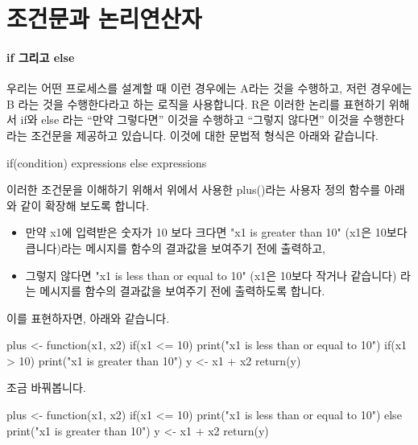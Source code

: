 \documentclass{book}
\begin{document}
\section{조건문과 논리연산자}

\paragraph{if 그리고 else} 
우리는 어떤 프로세스를 설계할 때 이런 경우에는 A라는 것을 수행하고, 저런 경우에는 B 라는 것을 수행한다라고 하는 로직을 사용합니다. 
R은 이러한 논리를 표현하기 위해서 if와 else 라는 ``만약 그렇다면'' 이것을 수행하고 ``그렇지 않다면'' 이것을 수행한다라는 조건문을 제공하고 있습니다.  
이것에 대한 문법적 형식은 아래와 같습니다. 

\begin{Schunk}
\begin{Soutput}
if(condition){
	expressions
}
else {
	expressions
}
\end{Soutput}
\end{Schunk}

이러한 조건문을 이해하기 위해서 위에서 사용한 plus()라는 사용자 정의 함수를 아래와 같이 확장해 보도록 합니다. 

\begin{itemize}
	\item 만약 x1에 입력받은 숫자가 10 보다 크다면 "x1 is greater than 10" (x1은 10보다 큽니다)라는 메시지를 함수의 결과값을 보여주기 전에 출력하고, 
	\item 그렇지 않다면 "x1 is less than or equal to 10" (x1은 10보다 작거나 같습니다) 라는 메시지를 함수의 결과값을 보여주기 전에 출력하도록 합니다.
\end{itemize}

이를 표현하자면, 아래와 같습니다. 

\begin{Schunk}
\begin{Soutput}
plus <- function(x1, x2){
	if(x1 <= 10) print("x1 is less than or equal to 10")
	if(x1 > 10) print("x1 is greater than 10")
	y <- x1 + x2
	return(y)
}
\end{Soutput}
\end{Schunk}

조금 바꿔봅니다. 

\begin{Schunk}
\begin{Soutput}
plus <- function(x1, x2){
	if(x1 <= 10) print("x1 is less than or equal to 10")
	else print("x1 is greater than 10")
	y <- x1 + x2
	return(y)
}
\end{Soutput}
\end{Schunk}
\end{document}
